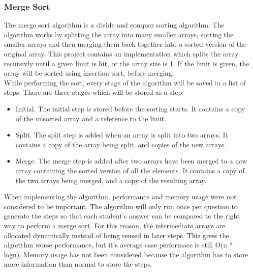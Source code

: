 \subsubsection{Merge Sort}
The merge sort algorithm is a divide and conquer sorting algorithm. The algorithm works by splitting the array into many smaller arrays, sorting the smaller arrays and then merging them back together into a sorted version of the original array. This project contains an implementation which splits the array recursivly until a given limit is hit, or the array size is 1. If the limit is given, the array will be sorted using insertion sort, before merging.
\\[11pt]
While performing the sort, every stage of the algorithm will be saved in a list of steps. There are three stages which will be stored as a step.
\begin{itemize}
    \item Initial. The initial step is stored before the sorting starts. It contains a copy of the unsorted array and a reference to the limit.
    \item Split. The split step is added when an array is split into two arrays. It contains a copy of the array being split, and copies of the new arrays.
    \item Merge. The merge step is added after two arrays have been merged to a new array containing the sorted version of all the elements. It contains a copy of the two arrays being merged, and a copy of the resulting array.
\end{itemize}
When implementing the algorithm, performance and memory usage were not considered to be important. The algorithm will only run once per question to generate the steps so that each student's answer can be compared to the right way to perform a merge sort. For this reason, the intermediate arrays are allocated dynamically instead of being reused in later steps. This gives the algorithm worse performance, but it's average case performace is still O(n * logn). Memory usage has not been considered because the algorithm has to store more information than normal to store the steps.
